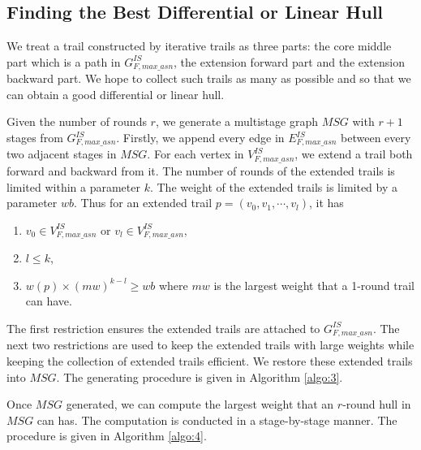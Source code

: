 \subsection{Finding the Best Differential or Linear Hull}\label{sec:fbh}

We treat a trail constructed by iterative trails as three parts: the core middle part which is a path in $G^{IS}_{F,max\_asn}$, the extension forward part and the extension backward part. We hope to collect such trails as many as possible and so that we can obtain a good differential or linear hull. 

Given the number of rounds $r$, we generate a multistage graph $MSG$ with $r+1$ stages from $G^{IS}_{F,max\_asn}$. Firstly, we append every edge in $E^{IS}_{F,max\_asn}$ between every two adjacent stages in $MSG$. For each vertex in $V^{IS}_{F,max\_asn}$, we extend a trail both forward and backward from it. The number of rounds of the extended trails is limited within a parameter $k$. The weight of the extended trails is limited by a parameter $wb$. Thus for an extended trail $p=(v_0,v_1,\cdots,v_l)$, it has 
\begin{enumerate}
	\item $v_0\in V^{IS}_{F,max\_asn}$ or $v_l\in V^{IS}_{F,max\_asn}$,
	\item $l\leq k$,
	\item $w(p)\times (mw)^{k-l} \geq wb$ where $mw$ is the largest weight that a 1-round trail can have.
\end{enumerate}
The first restriction ensures the extended trails are attached to $G^{IS}_{F,max\_asn}$. The next two restrictions are used to keep the extended trails with large weights while keeping the collection of extended trails efficient. We restore these extended trails into $MSG$. The generating procedure is given in Algorithm \ref{algo:3}. 

Once $MSG$ generated, we can compute the largest weight that an $r$-round hull in $MSG$ can has. The computation is conducted in a stage-by-stage manner. The procedure is given in Algorithm \ref{algo:4}.

